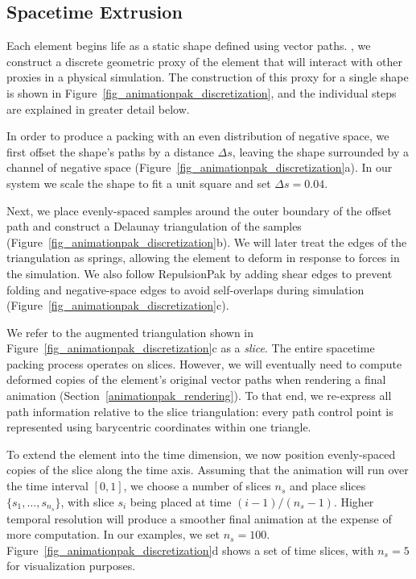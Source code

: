\subsection{Spacetime Extrusion}
\label{animationpak_spacetime_extrusion}

Each element begins life as a static shape defined using
vector paths.  , we construct a discrete
geometric proxy of the element that will interact with other
proxies in a physical simulation.  The construction of this proxy
for a single shape is shown in Figure~\ref{fig_animationpak_discretization}, and
the individual steps are explained in greater detail below.

In order to produce a packing with an even distribution of negative
space, we first offset the shape's paths by a distance $\Delta s$,
leaving the shape surrounded by a channel of negative space
(Figure~\ref{fig_animationpak_discretization}a).  In our system
we scale the shape to fit a unit square and set $\Delta s=0.04$.

\newtext
{
Next, we place evenly-spaced samples around the outer boundary of 
the offset path and construct a Delaunay triangulation of the samples
(Figure~\ref{fig_animationpak_discretization}b). We will
later treat the edges of the triangulation as springs, allowing the
element to deform in response to forces in the simulation.  
We also follow RepulsionPak by adding shear edges to prevent
folding and negative-space edges to avoid self-overlaps during simulation
(Figure~\ref{fig_animationpak_discretization}c).
}

We refer to the augmented triangulation shown in 
Figure~\ref{fig_animationpak_discretization}c as a \textit{slice}.  
The entire spacetime packing process operates on slices.  
However, we will eventually
need to compute deformed copies of the element's original vector paths 
when rendering a final animation (Section~\ref{animationpak_rendering}).
To that end, we re-express all path information relative to the
slice triangulation: every path control point is represented using
barycentric coordinates within one triangle.

To extend the element into the time dimension, 
we now position evenly-spaced copies of the slice along the time axis.
Assuming that the animation will run over the time interval $[0,1]$, 
we choose a number of slices $n_s$ and place slices $\{s_1,\ldots,s_{n_s}\}$,
with slice $s_i$ being placed at time $(i-1)/(n_s-1)$.
Higher temporal resolution will
produce a smoother final animation at the expense of more computation.
In our examples, we set $n_s=100$. 
Figure~\ref{fig_animationpak_discretization}d shows a set of time slices, with
$n_s=5$ for visualization purposes.

